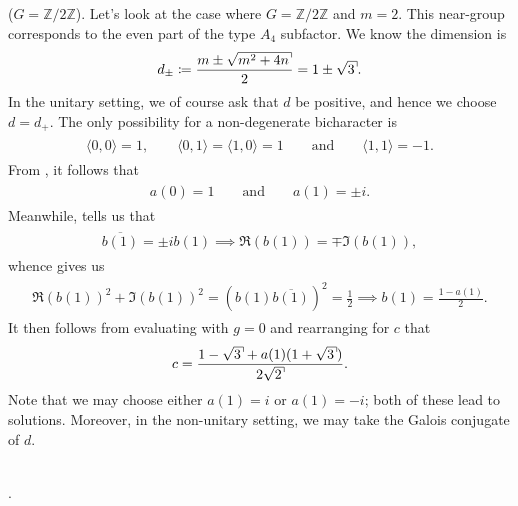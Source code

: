 \noindent\begin{example}\textup{($G = \mathbb{Z}/2\mathbb{Z}$).} Let's look at the case where $G = \mathbb{Z}/2\mathbb{Z}$ and $m = 2$. This near-group corresponds to the even part of the type $A_4$ subfactor. We know the dimension is
\begin{align*}
\begin{split}
d_\pm \coloneqq \frac{m \pm \csqrt{m^2 + 4n}}{2} = 1 \pm \csqrt{3}.
\end{split}
\end{align*}
\noindent In the unitary setting, we of course ask that $d$ be positive, and hence we choose $d = d_+$. The only possibility for a non-degenerate bicharacter is
\begin{align*}
\begin{split}
\langle 0, 0\rangle = 1,\qquad\langle 0, 1\rangle = \langle 1, 0\rangle = 1\qquad\text{and}\qquad\langle 1, 1\rangle = -1.
\end{split}
\end{align*}
\noindent From \cite[Equation 7.8]{Izu17}, it follows that
\begin{align*}
\begin{split}
a(0) = 1\qquad\text{and}\qquad a(1) = \pm i.
\end{split}
\end{align*}
\noindent Meanwhile, \cite[Equation 9.4]{Izu17} tells us that
\begin{align*}
\begin{split}
\overline{b(1)} = \pm i b(1) \implies \mathfrak{R}(b(1)) = \mp \mathfrak{I}(b(1)),
\end{split}
\end{align*}
\noindent whence \cite[Equation 9.3]{Izu17} gives us
\begin{align*}
\begin{split}
\mathfrak{R}(b(1))^2 + \mathfrak{I}(b(1))^2 = (b(1)\overline{b(1)})^2 = \frac{1}{2} \implies b(1) = \frac{1 - a(1)}{2}.
\end{split}
\end{align*}
\noindent It then follows from evaluating \cite[Equation 9.1]{Izu17} with $g = 0$ and rearranging for $c$ that
\begin{align*}
\begin{split}
c = \frac{1 - \csqrt{3} + a(1)(1 + \csqrt{3})}{2\csqrt{2}}.
\end{split}
\end{align*}
\noindent Note that we may choose either $a(1) = i$ or $a(1) = -i$; both of these lead to solutions. Moreover, in the non-unitary setting, we may take the Galois conjugate of $d$.
\end{example}
\newpage

\noindent\\ .\newpage

\renewcommand\thesection{R}
\begingroup
\setlength{\emergencystretch}{.5em}
\printbibliography[heading=none]
\endgroup
\newpage

